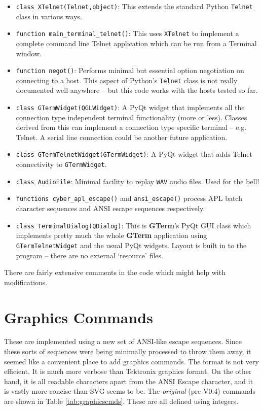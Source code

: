 \documentclass[a4paper,twoside,11pt]{article}
\begin{document}
\begin{itemize}
\item \texttt{class XTelnet(Telnet,object)}: This extends the standard Python \texttt{Telnet} class in various ways.
\item \texttt{function main\_terminal\_telnet()}: This uses \texttt{XTelnet}
      to implement a complete command line Telnet application
      which can be run from a Terminal window.
\item \texttt{function negot()}: Performs minimal but essential option negotiation on connecting to a host.
      This aspect of Python's \texttt{Telnet} class is not really documented well anywhere -- but this code works
      with the hosts tested so far.
\item \texttt{class GTermWidget(QGLWidget)}: A PyQt widget that implements all the connection type independent
      terminal functionality (more or less). Classes derived from this can implement a connection type specific
      terminal -- e.g. Telnet. A serial line connection could be another future application.
\item \texttt{class GTermTelnetWidget(GTermWidget)}: A PyQt widget that adds Telnet connectivity to \texttt{GTermWidget}.
\item \texttt{class AudioFile}: Minimal facility to replay \texttt{WAV} audio files. Used for the bell!
\item \texttt{functions cyber\_apl\_escape()} and \texttt{ansi\_escape()} process APL batch character sequences and ANSI escape
      sequences respectively.
\item \texttt{class TerminalDialog(QDialog)}: This is \textbf{GTerm}'s PyQt GUI class which implements pretty much the whole
      \textbf{GTerm} application using \texttt{GTermTelnetWidget} and the usual PyQt widgets. Layout is built in to the
      program -- there are no external `resource' files.
\end{itemize}
There are fairly extensive comments in the code which might help with modifications.

\section{Graphics Commands}
These are implemented using a new set of ANSI-like escape sequences. Since these sorts 
of sequences were being minimally processed
to throw them away, it seemed like a convenient place to add graphics commands. The format is not very efficient.
It is much more verbose than Tektronix graphics format. On the other hand, it is all readable characters apart from
the ANSI Escape character, and it is vastly more concise than SVG seems to be. The \emph{original} (pre-V0.4)
commands are shown in Table \ref{tab:graphicscmds}. These are all defined using integers.
\end{document}

